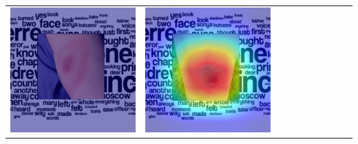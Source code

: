\begin{landscape}
\begin{table}[]
\begin{tabular}{@{}c c c c c c c c c c@{}}
			\includegraphics[width=.12\textheight ,keepaspectratio]{images/pretraining/gradcam/3/DenseNet201CombinedGradCam.png} &
			\includegraphics[width=.12\textheight ,keepaspectratio]{images/pretraining/gradcam/9/DenseNet201CombinedGradCam.png} &

\end{tabular}
\end{table}
\end{landscape}
